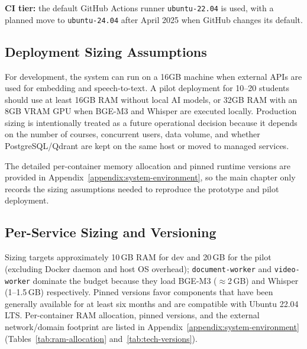 \textbf{CI tier:} the default GitHub Actions runner
\texttt{ubuntu-22.04} is used, with a planned move to
\texttt{ubuntu-24.04} after April 2025 when GitHub changes its default.

\subsection{Deployment Sizing Assumptions}
\label{subsec:hardware-tiers}

For development, the system can run on a 16GB machine when external
APIs are used for embedding and speech-to-text. A pilot deployment for
10--20 students should use at least 16GB RAM without local AI models, or
32GB RAM with an 8GB VRAM GPU when BGE-M3 and Whisper are executed
locally. Production sizing is intentionally treated as a future
operational decision because it depends on the number of courses,
concurrent users, data volume, and whether PostgreSQL/Qdrant are kept on
the same host or moved to managed services.

The detailed per-container memory allocation and pinned runtime versions
are provided in Appendix~\ref{appendix:system-environment}, so the main
chapter only records the sizing assumptions needed to reproduce the
prototype and pilot deployment.

\subsection{Per-Service Sizing and Versioning}
\label{subsec:sizing-versioning}

Sizing targets approximately 10\,GB RAM for dev and 20\,GB for the pilot
(excluding Docker daemon and host OS overhead);
\texttt{document-worker} and \texttt{video-worker} dominate the budget
because they load BGE-M3 ($\approx$2\,GB) and Whisper (1--1.5\,GB)
respectively. Pinned versions favor components that have been generally
available for at least six months and are compatible with Ubuntu 22.04
LTS. Per-container RAM allocation, pinned versions, and the external
network/domain footprint are listed in
Appendix~\ref{appendix:system-environment}
(Tables~\ref{tab:ram-allocation} and~\ref{tab:tech-versions}).



